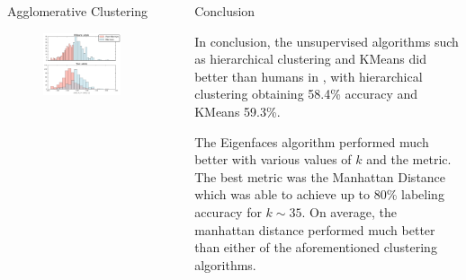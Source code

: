 \documentclass[final]{beamer}
\newlength{\sepwid}
\newlength{\onecolwid}
\begin{document}
\begin{frame}[t]
\begin{columns}[t]
\begin{column}{\onecolwid}
\begin{block}{Agglomerative Clustering}
\begin{figure}
\centering
  \includegraphics[width=.85\linewidth]{../data/eigennorm.pdf}
  \label{fig:eigennorm}
\end{figure}

\end{block}



\end{column} %


\begin{column}{\sepwid}\end{column} %

\begin{column}{\onecolwid} %


\begin{block}{Conclusion}

In conclusion, the unsupervised algorithms such as hierarchical clustering and KMeans did better than humans in \cite{MormonID}, with hierarchical clustering obtaining 58.4\% accuracy and KMeans 59.3\%. 

The Eigenfaces algorithm performed much better with various values of $k$ and the metric. The best metric was the Manhattan Distance which was able to achieve up to 80\% labeling accuracy for $k \sim 35$. On average, the manhattan distance performed much better than either of the aforementioned clustering algorithms.


\end{block}
\end{column}
\end{columns}
\end{frame}
\end{document}
